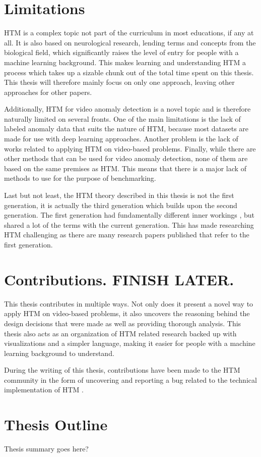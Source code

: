 \section{Limitations}
HTM is a complex topic not part of the curriculum in most educations, if any at all. It is also based on neurological research, lending terms and concepts from the biological field, which significantly raises the level of entry for people with a machine learning background. This makes learning and understanding HTM a process which takes up a sizable chunk out of the total time spent on this thesis. This thesis will  therefore mainly focus on only one approach, leaving other approaches for other papers.\par
Additionally, HTM for video anomaly detection is a novel topic and is therefore naturally limited on several fronts. One of the main limitations is the lack of labeled anomaly data that suits the nature of HTM, because most datasets are made for use with deep learning approaches. Another problem is the lack of works related to applying HTM on video-based problems. Finally, while there are other methods that can be used for video anomaly detection, none of them are based on the same premises as HTM. This means that there is a major lack of methods to use for the purpose of benchmarking.
\par
Last but not least, the HTM theory described in this thesis is not the first generation, it is actually the third generation which builds upon the second generation. The first generation had fundamentally different inner workings \cite{htm_zeta1}, but shared a lot of the terms with the current generation. This has made researching HTM challenging as there are many research papers published that refer to the first generation.
\section{Contributions. FINISH LATER.}
This thesis contributes in multiple ways. Not only does it present a novel way to apply HTM on video-based problems, it also uncovers the reasoning behind the design decisions that were made as well as providing thorough analysis. This thesis also acts as an organization of HTM related research backed up with visualizations and a simpler language, making it easier for people with a machine learning background to understand.
\par
During the writing of this thesis, contributions have been made to the HTM community in the form of uncovering and reporting a bug related to the technical implementation of HTM \cite{github_contrib}.
\section{Thesis Outline}
Thesis summary goes here?
